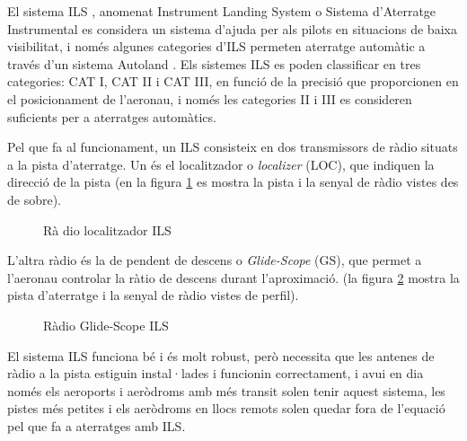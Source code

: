 \documentclass[10pt,a4paper,twocolumn,twoside]{article}
\begin{document}
El sistema ILS \cite{ILS}, anomenat Instrument Landing System o Sistema d'Aterratge Instrumental es considera un sistema d'ajuda per als pilots en situacions de baixa visibilitat, i només algunes categories d'ILS permeten aterratge automàtic a través
d'un sistema Autoland \cite{Autoland}.
Els sistemes ILS es poden classificar en tres categories: CAT I, CAT II i CAT III,
en funció de la precisió que proporcionen en el posicionament de l'aeronau, i només
les categories II i III es consideren suficients per a aterratges automàtics.

Pel que fa al funcionament, un ILS consisteix en dos transmissors de ràdio situats
a la pista d'aterratge. Un és el localitzador o \textit{localizer} (LOC), que 
indiquen la direcció de la pista (en la figura \ref{fig-ils-loc} es mostra la pista i la
senyal de ràdio vistes des de sobre).


\begin{figure}[!h]
\centering
{}
	\caption{Rà dio localitzador ILS}
	\label{fig-ils-loc}
\end{figure}

L'altra ràdio és la de pendent de descens o \textit{Glide-Scope} (GS), que permet a
l'aeronau controlar la ràtio de descens durant l'aproximació. (la figura \ref{fig-ils-gs} mostra la
pista d'aterratge i la senyal de ràdio vistes de perfil).

\begin{figure}[!h]
\centering
{}
	\caption{Ràdio Glide-Scope ILS}
	\label{fig-ils-gs}
\end{figure}

El sistema ILS funciona bé i és molt robust, però necessita que les antenes de ràdio
a la pista estiguin instal·lades i funcionin correctament, i avui en dia només els
aeroports i aeròdroms amb més transit solen tenir aquest sistema, les pistes més petites i els aeròdroms en llocs remots solen quedar fora de l'equació pel que fa a aterratges
amb ILS.
\end{document}
